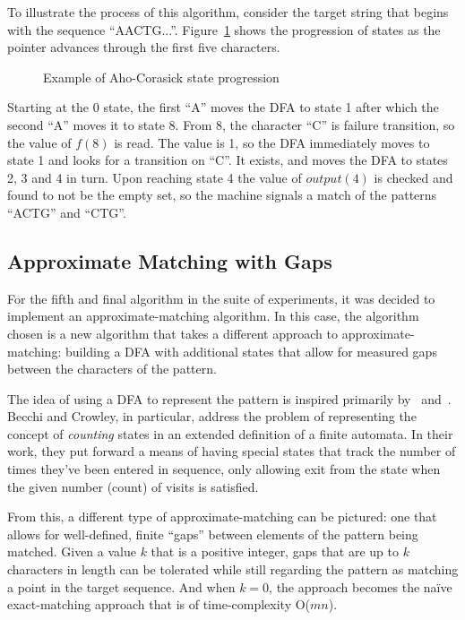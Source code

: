 To illustrate the process of this algorithm, consider the target string that begins with the sequence ``AACTG...''. Figure~\ref{fig:ac_progression} shows the progression of states as the pointer advances through the first five characters.

\begin{figure}[ht]
\centering

\caption{Example of Aho-Corasick state progression}
\label{fig:ac_progression}
\end{figure}

Starting at the 0 state, the first ``A'' moves the DFA to state 1 after which the second ``A'' moves it to state 8. From 8, the character ``C'' is failure transition, so the value of $f(8)$ is read. The value is 1, so the DFA immediately moves to state 1 and looks for a transition on ``C''. It exists, and moves the DFA to states 2, 3 and 4 in turn. Upon reaching state 4 the value of $output(4)$ is checked and found to not be the empty set, so the machine signals a match of the patterns ``ACTG'' and ``CTG''.

\subsection{Approximate Matching with Gaps}

For the fifth and final algorithm in the suite of experiments, it was decided to implement an approximate-matching algorithm. In this case, the algorithm chosen is a new algorithm that takes a different approach to approximate-matching: building a DFA with additional states that allow for measured gaps between the characters of the pattern.

The idea of using a DFA to represent the pattern is inspired primarily by~\cite{aho.corasick.1975} and~\cite{becchi.crowley.2008}. Becchi and Crowley, in particular, address the problem of representing the concept of \textit{counting} states in an extended definition of a finite automata. In their work, they put forward a means of having special states that track the number of times they've been entered in sequence, only allowing exit from the state when the given number (count) of visits is satisfied.

From this, a different type of approximate-matching can be pictured: one that allows for well-defined, finite ``gaps'' between elements of the pattern being matched. Given a value $k$ that is a positive integer, gaps that are up to $k$ characters in length can be tolerated while still regarding the pattern as matching a point in the target sequence. And when $k = 0$, the approach becomes the na\"{i}ve exact-matching approach that is of time-complexity O($mn$).


